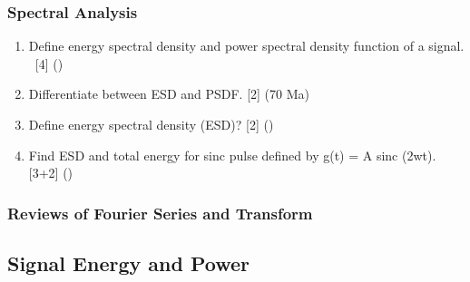 \documentclass[12pt]{article}
\newcommand{\enter}{\\\textcolor{white}{1}}
\begin{document}
    \subsubsection{Spectral Analysis}
      \begin{enumerate}
        \item Define energy spectral density and power spectral density function of a signal. 
        \enter\hfill [4] ()

        \item Differentiate between ESD and PSDF. \hfill [2] (70 Ma)

        \item Define energy spectral density (ESD)? \hfill [2] ()

        \item Find ESD and total energy for sinc pulse defined by g(t) = A sinc (2wt). \hfill [3+2] ()
      \end{enumerate}

    \subsubsection{Reviews of Fourier Series and Transform}
  \subsection{Signal Energy and Power}
\end{document}
